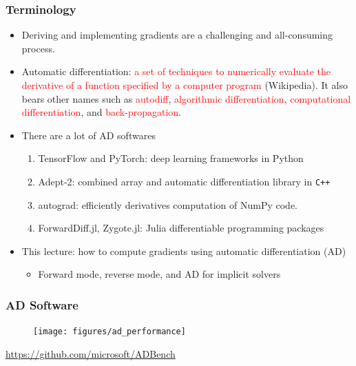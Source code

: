 \documentclass{beamer}
\newcommand{\red}[1]{\textcolor{red}{#1}}
\begin{document}
\begin{frame}
	\frametitle{Terminology}
	
	\begin{itemize}
	
	\item Deriving and implementing gradients are a challenging and all-consuming process. 
	
		\item Automatic differentiation: \red{a set of techniques to numerically evaluate the derivative of a function specified by a computer program} (Wikipedia). It also bears other names such as \red{autodiff}, \red{algorithmic differentiation}, \red{computational differentiation}, and \red{back-propagation}. 


		\item There are a lot of AD softwares
		\begin{enumerate}
			\item TensorFlow and PyTorch: deep learning frameworks in Python
			\item Adept-2: combined array and automatic differentiation library in \texttt{C++} 
			\item autograd: efficiently derivatives computation of NumPy code.
			\item ForwardDiff.jl, Zygote.jl: Julia differentiable programming packages
		\end{enumerate}
		
		 
		\item This lecture: how to compute gradients using automatic differentiation (AD)

\begin{itemize}	
	\item  Forward mode, reverse mode, and AD for implicit solvers 
	\end{itemize}
	
	
		
		 
	\end{itemize}
\end{frame}

\begin{frame}
	\frametitle{AD Software}
	
	\begin{figure}[hbt]
  \texttt{[image: figures/ad\_performance]}
\end{figure}

{\scriptsize \url{https://github.com/microsoft/ADBench}}

\end{frame}
\end{document}
